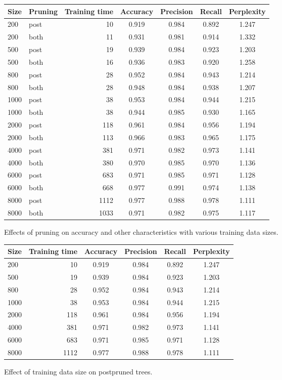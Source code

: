 \documentclass[a4paper,10pt]{article}
\begin{document}
\begin{figure}
  \centering
\begin{tabular}{|l|l|r|c|c|c|c|}
\hline
Size & Pruning & Training time & Accuracy & Precision & Recall &
Perplexity \\ \hline 
200 & post & 10 & 0.919 & 0.984 & 0.892 & 1.247 \\
200 & both & 11 & 0.931 & 0.981 & 0.914 & 1.332 \\
500 & post & 19 & 0.939 & 0.984 & 0.923 & 1.203 \\
500 & both & 16 & 0.936 & 0.983 & 0.920 & 1.258 \\
800 & post & 28 & 0.952 & 0.984 & 0.943 & 1.214 \\
800 & both & 28 & 0.948 & 0.984 & 0.938 & 1.207 \\
1000 & post & 38 & 0.953 & 0.984 & 0.944 & 1.215 \\
1000 & both & 38 & 0.944 & 0.985 & 0.930 & 1.165 \\
2000 & post & 118 & 0.961 & 0.984 & 0.956 & 1.194 \\
2000 & both & 113 & 0.966 & 0.983 & 0.965 & 1.175 \\
4000 & post & 381 & 0.971 & 0.982 & 0.973 & 1.141 \\
4000 & both & 380 & 0.970 & 0.985 & 0.970 & 1.136 \\
6000 & post & 683 & 0.971 & 0.985 & 0.971 & 1.128 \\
6000 & both & 668 & 0.977 & 0.991 & 0.974 & 1.138 \\
8000 & post & 1112 & 0.977 & 0.988 & 0.978 & 1.111 \\
8000 & both & 1033 & 0.971 & 0.982 & 0.975 & 1.117 \\
\hline
\end{tabular}
  \caption{Effects of pruning on accuracy and other characteristics with
    various training data sizes.}
  \label{tbl:classifiers} 
\end{figure}

\begin{figure}
  \centering
\begin{tabular}{|l|r|c|c|c|c|}
\hline
Size & Training time & Accuracy & Precision & Recall &
Perplexity \\ \hline 
200  & 10 & 0.919 & 0.984 & 0.892 & 1.247 \\
500  & 19 & 0.939 & 0.984 & 0.923 & 1.203 \\
800  & 28 & 0.952 & 0.984 & 0.943 & 1.214 \\
1000 & 38 & 0.953 & 0.984 & 0.944 & 1.215 \\
2000 & 118 & 0.961 & 0.984 & 0.956 & 1.194 \\
4000 & 381 & 0.971 & 0.982 & 0.973 & 1.141 \\
6000 & 683 & 0.971 & 0.985 & 0.971 & 1.128 \\
8000 & 1112 & 0.977 & 0.988 & 0.978 & 1.111 \\
\hline
\end{tabular}
  \caption{Effect of training data size on postpruned trees.}
  \label{tbl:classifiers-postpruned} 
\end{figure}
\end{document}
